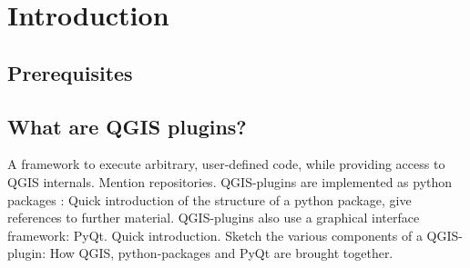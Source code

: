 \section{Introduction}
\label{sect:introduction}

\subsection{Prerequisites}
\label{ssect:prerequisites}

\subsection{What are QGIS plugins?}
\par
A framework to execute arbitrary, user-defined code, while providing access to QGIS internals. Mention repositories.
QGIS-plugins are implemented as python packages : Quick introduction of the structure of a python package, give references to further material.
QGIS-plugins also use a graphical interface framework: PyQt. Quick introduction.
Sketch the various components of a QGIS-plugin: How QGIS, python-packages and PyQt are brought together.
